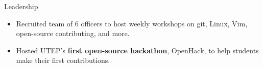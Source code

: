 \documentclass{resume} %
\begin{document}
\begin{workSection}{Leadership}
    
    \customItem[
    	title=President \& Founder - Free and Open-Source Software Club at UTEP,
    	duration=December 2023 - Present
    ]
    \begin{itemize}
    	\vspace{-0.5em}
    	\itemsep -6pt {}
    	\item Recruited team of 6 officers to host weekly workshops on git, Linux, Vim, open-source contributing, and more.
		\item Hosted UTEP's \textbf{first open-source hackathon}, OpenHack, to help students make their first contributions.
    \end{itemize}


\end{workSection}
\end{document}
